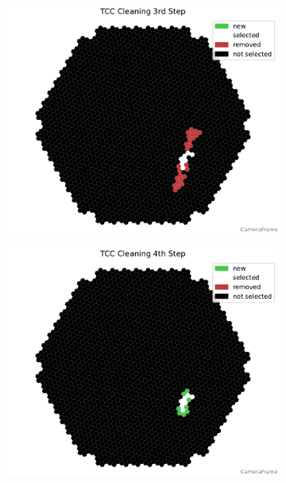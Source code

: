 \begin{figure}
\begin{subfigure}[t]{0.32\textwidth}
        \includegraphics[width=\textwidth]{plots/cleaner_steps/tcc_3.pdf}
    \end{subfigure}
    \begin{subfigure}[]{0.32\textwidth}
        \includegraphics[width=\textwidth]{plots/cleaner_steps/tcc_4.pdf}
    \end{subfigure}
    \begin{subfigure}[]{0.32\textwidth}

\end{subfigure}
\end{figure}
